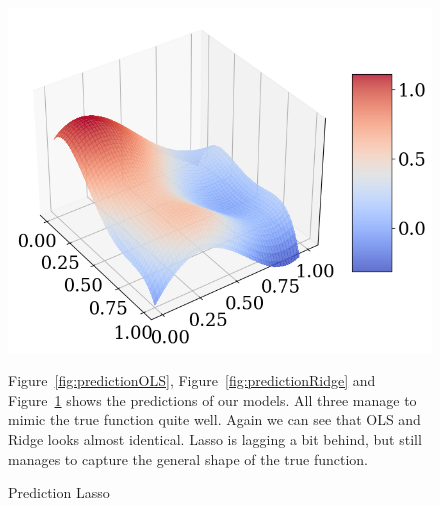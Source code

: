 \documentclass[twoside,11pt]{report}
\begin{document}
\begin{figure}[h]
\begin{minipage}[!htb]{.48\linewidth}
    \begin{center}
        \includegraphics[width=1.0\textwidth]{../runsAndAdditions/predictionLasso.png}
        \caption{Prediction Lasso}\label{fig:predictionLasso}
\end{center}
\end{minipage}
\hspace{4mm}
\begin{minipage}[!htb]{.48\linewidth}
    Figure~\ref{fig:predictionOLS}, Figure~\ref{fig:predictionRidge} and Figure~\ref{fig:predictionLasso} shows the 
    predictions of our models. All three manage to mimic the true function quite well. Again we can see that OLS and Ridge
    looks almost identical. Lasso is lagging a bit behind, but still manages to capture the general shape of the true function.
\end{minipage}
\end{figure}
\end{document}
